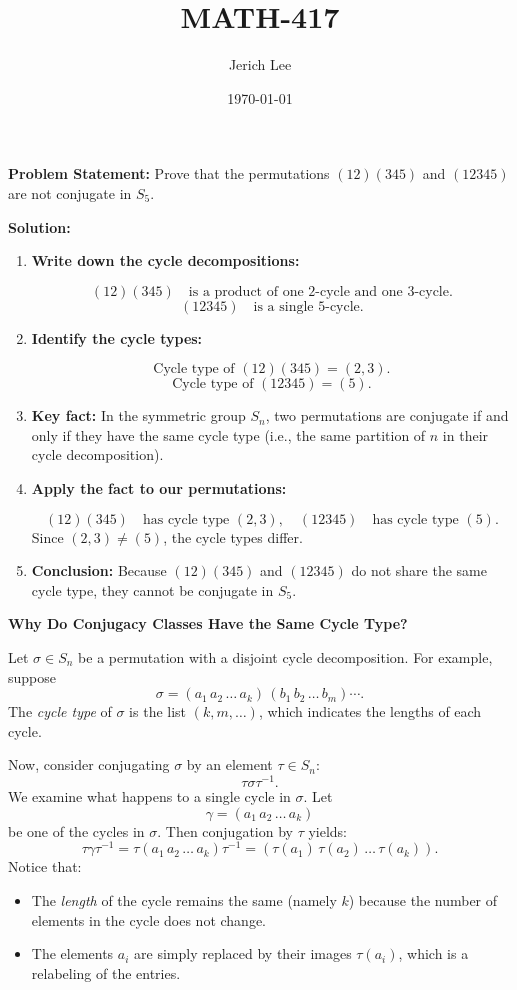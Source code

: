 \documentclass[12pt]{article}
\title{MATH-417}
\author{Jerich Lee}
\date{\today}
\theoremstyle{definition} %
\theoremstyle{plain} %
\begin{document}
\maketitle
\noindent
\textbf{Problem Statement:} Prove that the permutations $(12)(345)$ and $(12345)$ are not conjugate in $S_5.$

\bigskip

\noindent
\textbf{Solution:}

\begin{enumerate}

\item \textbf{Write down the cycle decompositions:}

\[
(12)(345) \quad \text{is a product of one 2-cycle and one 3-cycle.}
\]
\[
(12345) \quad \text{is a single 5-cycle.}
\]

\item \textbf{Identify the cycle types:}

\[
\text{Cycle type of } (12)(345) = (2,3).
\]
\[
\text{Cycle type of } (12345) = (5).
\]

\item \textbf{Key fact:} In the symmetric group $S_n$, two permutations are conjugate
if and only if they have the same cycle type (i.e., the same partition of $n$ in their cycle decomposition).

\item \textbf{Apply the fact to our permutations:}

\[
(12)(345) \quad \text{has cycle type }(2,3), \quad
(12345) \quad \text{has cycle type } (5).
\]
Since $(2,3)\neq (5)$, the cycle types differ.

\item \textbf{Conclusion:} Because $(12)(345)$ and $(12345)$ do not share the same cycle type, 
they cannot be conjugate in $S_5$.

\end{enumerate}
\noindent
\textbf{Why Do Conjugacy Classes Have the Same Cycle Type?}

\bigskip

\noindent
Let \(\sigma \in S_n\) be a permutation with a disjoint cycle decomposition. For example, suppose
\[
\sigma = (a_1\,a_2\,\dots\,a_k) \, (b_1\,b_2\,\dots\,b_m) \cdots.
\]
The \emph{cycle type} of \(\sigma\) is the list \((k, m, \dots)\), which indicates the lengths of each cycle.

\bigskip

\noindent
Now, consider conjugating \(\sigma\) by an element \(\tau \in S_n\):
\[
\tau \sigma \tau^{-1}.
\]
We examine what happens to a single cycle in \(\sigma\). Let
\[
\gamma = (a_1\,a_2\,\dots\,a_k)
\]
be one of the cycles in \(\sigma\). Then conjugation by \(\tau\) yields:
\[
\tau \gamma \tau^{-1} = \tau (a_1\,a_2\,\dots\,a_k) \tau^{-1} = (\tau(a_1)\,\tau(a_2)\,\dots\,\tau(a_k)).
\]
Notice that:
\begin{itemize}
    \item The \emph{length} of the cycle remains the same (namely \(k\)) because the number of elements in the cycle does not change.
    \item The elements \(a_i\) are simply replaced by their images \(\tau(a_i)\), which is a relabeling of the entries.
\end{itemize}
\end{document}
